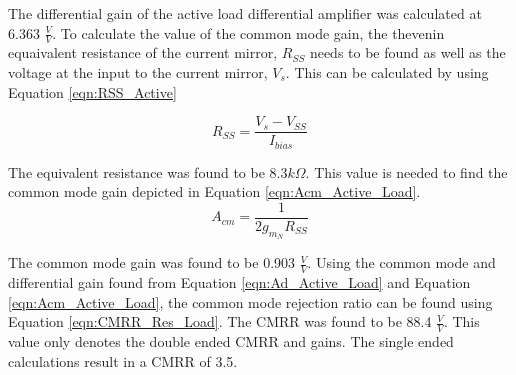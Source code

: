 The differential gain of the active load differential amplifier was calculated at 6.363 $\frac{V}{V}$. To calculate the value of the common mode gain, the thevenin equaivalent resistance of the current mirror, $R_{SS}$ needs to be found as well as the voltage at the input to the current mirror, $V_s$. This can be calculated by using Equation \ref{eqn:RSS_Active}

\begin{equation}
    R_{SS} = \frac{V_s-V_{SS}}{I_{bias}}
    \label{eqn:RSS_Active}
\end{equation}

The equivalent resistance was found to be 8.3$k\Omega$. This value is needed to find the common mode gain depicted in Equation \ref{eqn:Acm_Active_Load}.
\begin{equation}
    A_{cm} = \frac{1}{2g_{m_N}R_{SS}}
    \label{eqn:Acm_Active_Load}
\end{equation}

The common mode gain was found to be 0.903 $\frac{V}{V}$. Using the common mode and differential gain found from Equation \ref{eqn:Ad_Active_Load} and Equation \ref{eqn:Acm_Active_Load}, the common mode rejection ratio can be found using Equation \ref{eqn:CMRR_Res_Load}. The CMRR was found to be 88.4 $\frac{V}{V}$. This value only denotes the double ended CMRR and gains. The single ended calculations result in a CMRR of 3.5. 



